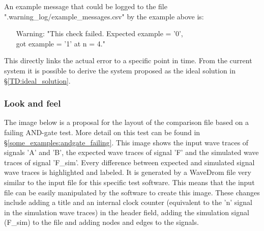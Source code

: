 An example message that could be logged to the file ".warning\_log/example\_messages.csv" by the example above is:
\begin{customenv}
	\label{log:error_message}
	\begin{itemize}
		\caption{Example error message}
		\centering
		\item [Warning:] "This check failed. Expected example = '0', \\
		got example = '1' at n = 4."
	\end{itemize}
\end{customenv}\nline
This directly links the actual error to a specific point in time. From the current system it is possible to derive the system proposed as the ideal solution in §\ref{TD:ideal_solution}.\newpage
\subsubsection{Look and feel}
The image below is a proposal for the layout of the comparison file based on a failing AND-gate test. More detail on this test can be found in §\ref{some_examples:andgate_failing}.
\nline
This image shows the input wave traces of signals 'A' and 'B', the expected wave traces of signal 'F' and the simulated wave traces of signal 'F\_sim'. Every difference between expected and simulated signal wave traces is highlighted and labeled.
\npar
It is generated by a WaveDrom file very similar to the input file for this specific test software. This means that the input file can be easily manipulated by the software to create this image.
\npar
These changes include adding a title and an internal clock counter (equivalent to the 'n' signal in the simulation wave traces) in the header field, adding the simulation signal (F\_sim) to the file and adding nodes and edges to the signals.\newpage
